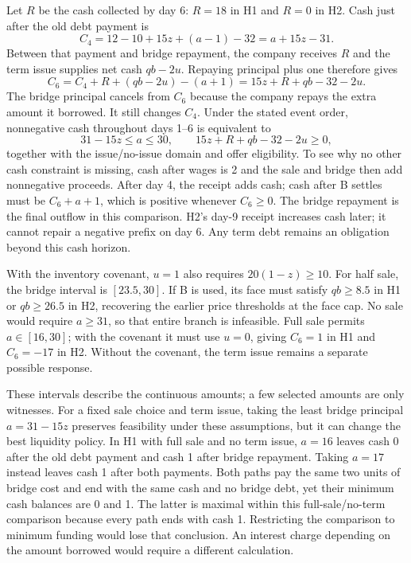 Let $R$ be the cash collected by day 6: $R=18$ in H1 and $R=0$ in H2.
Cash just after the old debt payment is
\begin{equation}
 C_4=12-10+15z+(a-1)-32=a+15z-31.
\end{equation}
Between that payment and bridge repayment, the company receives $R$ and the
term issue supplies net cash $qb-2u$. Repaying principal plus one therefore gives
\begin{equation}
 C_6=C_4+R+(qb-2u)-(a+1)
     =15z+R+qb-32-2u.
\end{equation}
The bridge principal cancels from $C_6$ because the company repays the extra
amount it borrowed. It still changes $C_4$. Under the stated event order,
nonnegative cash throughout days 1--6 is equivalent to
\begin{equation}
 31-15z\leq a\leq30,
 \qquad 15z+R+qb-32-2u\geq0,
\end{equation}
together with the issue/no-issue domain and offer eligibility. To see why no
other cash constraint is missing, cash after wages is 2 and the sale and bridge
then add nonnegative proceeds. After day 4, the receipt adds cash; cash after B
settles must be $C_6+a+1$, which is positive whenever $C_6\geq0$. The bridge
repayment is the final outflow in this comparison. H2's day-9 receipt increases
cash later; it cannot repair a negative prefix on day 6. Any term debt remains
an obligation beyond this cash horizon.

With the inventory covenant, $u=1$ also requires $20(1-z)\geq10$.
For half sale, the bridge interval is $[23.5,30]$. If B is used, its face must
satisfy $qb\geq8.5$ in H1 or $qb\geq26.5$ in H2, recovering the earlier price
thresholds at the face cap. No sale would require $a\geq31$, so that entire
branch is infeasible. Full sale permits $a\in[16,30]$; with the covenant it
must use $u=0$, giving $C_6=1$ in H1 and $C_6=-17$ in H2. Without the covenant,
the term issue remains a separate possible response.

These intervals describe the continuous amounts; a few selected amounts are
only witnesses. For a fixed sale choice and term issue, taking the least
bridge principal $a=31-15z$ preserves feasibility under these assumptions, but
it can change the best liquidity policy. In H1 with full sale and no term issue,
$a=16$ leaves cash 0 after the old debt payment and cash 1 after bridge
repayment. Taking $a=17$ instead leaves cash 1 after both payments. Both paths
pay the same two units of bridge cost and end with the same cash and no bridge
debt, yet their minimum cash balances are 0 and 1. The latter is maximal within
this full-sale/no-term comparison because every path ends with cash 1. Restricting
the comparison to minimum funding would lose that conclusion. An interest
charge depending on the amount borrowed would require a different calculation.

